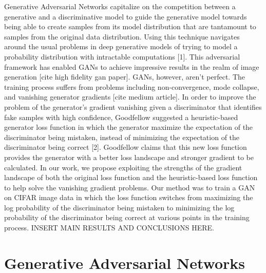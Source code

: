 \documentclass[conference]{IEEEtran}
\begin{document}
Generative Adversarial Networks capitalize on the competition between a generative and a discriminative model to guide the generative model towards being able to create samples from its model distribution that are tantamount to samples from the original data distribution. Using this technique navigates around the usual problems in deep generative models of trying to model a probability distribution with intractable computations [1]. This adversarial framework has enabled GANs to achieve impressive results in the realm of image generation [cite high fidelity gan paper]. 
\newline \indent GANs, however, aren’t perfect. The training process suffers from problems including non-convergence, mode collapse, and vanishing generator gradients [cite medium article]. In order to improve the problem of the generator’s gradient vanishing given a discriminator that identifies fake samples with high confidence, Goodfellow suggested a heuristic-based generator loss function in which the generator maximize the expectation of the discriminator being mistaken, instead of minimizing the expectation of the discriminator being correct [2]. Goodfellow claims that this new loss function provides the generator with a better loss landscape and stronger gradient to be calculated. 
\newline \indent In our work, we propose exploiting the strengths of the gradient landscape of both the original loss function and the heuristic-based loss function to help solve the vanishing gradient problems. Our method was to train a GAN on CIFAR image data in which the loss function switches from maximizing the log probability of the discriminator being mistaken to minimizing the log probability of the discriminator being correct at various points in the training process. INSERT MAIN RESULTS AND CONCLUSIONS HERE. 



\section{Generative Adversarial Networks}
\end{document}

